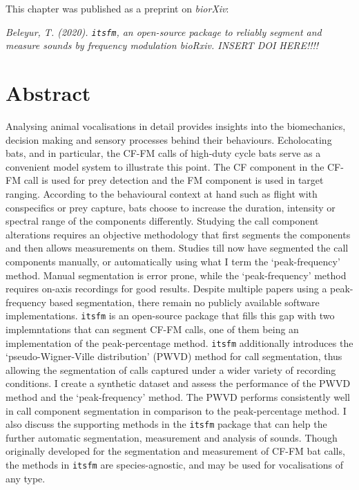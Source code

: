 \documentclass[
]{book}
\begin{document}

This chapter was published as a preprint on \emph{biorXiv}:

\emph{Beleyur, T. (2020). \texttt{itsfm}, an open-source package to reliably segment and measure sounds by frequency modulation bioRxiv. INSERT DOI HERE!!!!}

\newpage

\hypertarget{abstractitsfm}{%
\section*{Abstract}\label{abstractitsfm}}

Analysing animal vocalisations in detail provides insights into the biomechanics, decision making and sensory processes behind their behaviours. Echolocating bats, and in particular, the CF-FM calls of high-duty cycle bats serve as a convenient model system to illustrate this point. The CF component in the CF-FM call is used for prey detection and the FM component is used in target ranging. According to the behavioural context at hand such as flight with conspecifics or prey capture, bats choose to increase the duration, intensity or spectral range of the components differently. Studying the call component alterations requires an objective methodology that first segments the components and then allows measurements on them. Studies till now have segmented the call components manually, or automatically using what I term the `peak-frequency' method. Manual segmentation is error prone, while the `peak-frequency' method requires on-axis recordings for good results. Despite multiple papers using a peak-frequency based segmentation, there remain no publicly available software implementations. \texttt{itsfm} is an open-source package that fills this gap with two implemntations that can segment CF-FM calls, one of them being an implementation of the peak-percentage method. \texttt{itsfm} additionally introduces the `pseudo-Wigner-Ville distribution' (PWVD) method for call segmentation, thus allowing the segmentation of calls captured under a wider variety of recording conditions. I create a synthetic dataset and assess the performance of the PWVD method and the `peak-frequency' method. The PWVD performs consistently well in call component segmentation in comparison to the peak-percentage method. I also discuss the supporting methods in the \texttt{itsfm} package that can help the further automatic segmentation, measurement and analysis of sounds. Though originally developed for the segmentation and measurement of CF-FM bat calls, the methods in \texttt{itsfm} are species-agnostic, and may be used for vocalisations of any type.
\end{document}
